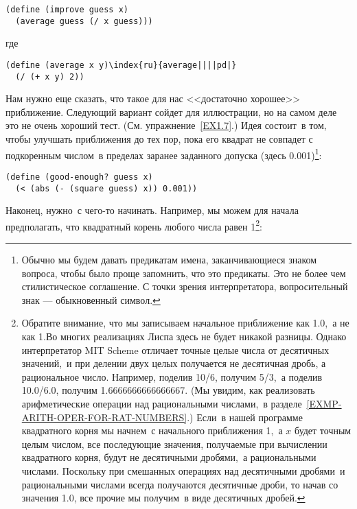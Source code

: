 \begin{Verbatim}[fontsize=\small]
(define (improve guess x)
  (average guess (/ x guess)))
\end{Verbatim}
где

\begin{Verbatim}[fontsize=\small]
(define (average x y)\index{ru}{average||||pd|}
  (/ (+ x y) 2))
\end{Verbatim}
Нам нужно еще сказать, что такое для нас <<достаточно хорошее>>
приближение.  Следующий вариант сойдет для иллюстрации, но на самом
деле это не очень хороший тест. (См. упражнение~\ref{EX1.7}.)  Идея состоит~в том, чтобы улучшать
приближения до тех пор, пока его квадрат не совпадет с
подкоренным числом~в пределах заранее заданного
допуска (здесь 0.001)\footnote{Обычно мы
  будем давать предикатам
  имена, заканчивающиеся знаком вопроса, чтобы было проще запомнить, что
  это предикаты.  Это не более чем стилистическое соглашение. С точки
  зрения интерпретатора, вопросительный знак --- обыкновенный
  символ.}:
\begin{Verbatim}[fontsize=\small]
(define (good-enough? guess x)
  (< (abs (- (square guess) x)) 0.001))
\end{Verbatim}
Наконец, нужно~с чего-то начинать. Например, мы можем для начала
предполагать, что квадратный корень любого числа равен 1\footnote{Обратите внимание, что мы записываем начальное приближение как
1.0,~а не как 1.Во многих
реализациях Лиспа здесь не будет никакой разницы.
Однако интерпретатор MIT Scheme отличает 
точные целые числа 
от десятичных значений,~и при 
делении двух целых получается не 
десятичная дробь, а
рациональное число.  Например, поделив 10/6,
получим 5/3,~а поделив 10.0/6.0, получим
1.6666666666666667. (Мы увидим, как реализовать арифметические
операции над рациональными числами,~в разделе~\ref{EXMP-ARITH-OPER-FOR-RAT-NUMBERS}.)
Если~в нашей программе квадратного корня мы начнем~с начального
приближения 1,~а $x$ будет точным целым числом, все
последующие значения, получаемые при вычислении квадратного корня,
будут не десятичными дробями,~а рациональными числами.  Поскольку при
смешанных операциях над десятичными дробями~и рациональными числами
всегда получаются десятичные дроби, то начав со значения 1.0, все
прочие мы получим~в виде десятичных дробей.}:
